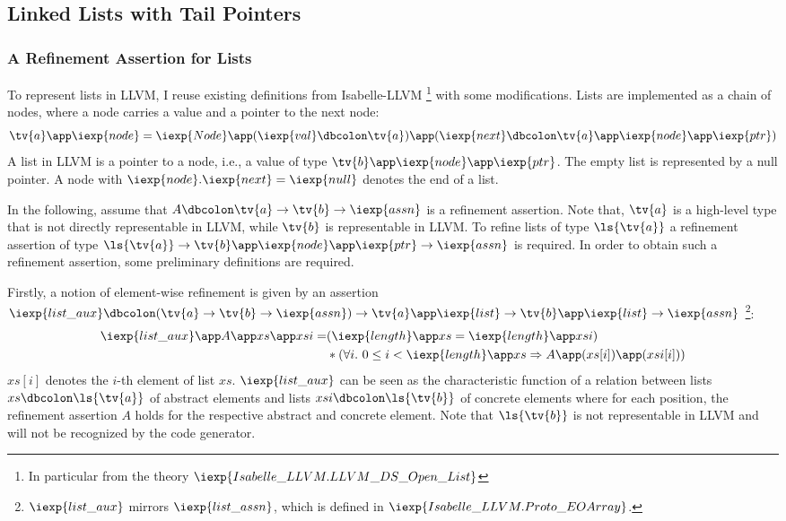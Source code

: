 \subsection{Linked Lists with Tail Pointers}\label{sec:lists-with-tail-pointers}

\subsubsection{A Refinement Assertion for Lists}

To represent lists in LLVM, I reuse existing definitions from Isabelle-LLVM \footnote{In particular from the theory $\iexp{Isabelle\_LLVM.LLVM\_DS\_Open\_List}$} with some modifications.
Lists are implemented as a chain of nodes, where a node carries a value and a pointer to the next node:
$$
  \tv{a} \app \iexp{node} = \iexp{Node} \app (\iexp{val} \dbcolon \tv{a}) \app (\iexp{next} \dbcolon \tv{a} \app \iexp{node} \app \iexp{ptr})
$$
A list in LLVM is a pointer to a node, i.e., a value of type $\tv{b} \app \iexp{node} \app \iexp{ptr}$.
The empty list is represented by a null pointer.
A node with $\iexp{node}.\iexp{next} = \iexp{null}$ denotes the end of a list.

In the following, assume that $A \dbcolon \tv{a} \rightarrow \tv{b} \rightarrow \iexp{assn}$ is a refinement assertion.
Note that, $\tv{a}$ is a high-level type that is not directly representable in LLVM, while $\tv{b}$ is representable in LLVM.
To refine lists of type $\ls{\tv{a}}$ a refinement assertion of type $\ls{\tv{a}} \rightarrow \tv{b} \app \iexp{node} \app \iexp{ptr} \rightarrow \iexp{assn}$ is required.
In order to obtain such a refinement assertion, some preliminary definitions are required.

Firstly, a notion of element-wise refinement is given by an assertion $\iexp{list\_aux} \dbcolon (\tv{a} \rightarrow \tv{b} \rightarrow \iexp{assn}) \rightarrow \tv{a} \app \iexp{list} \rightarrow \tv{b} \app \iexp{list} \rightarrow \iexp{assn}$
\footnote{$\iexp{list\_aux}$ mirrors $\iexp{list\_assn}$, which is defined in $\iexp{Isabelle\_LLVM.Proto\_EOArray}$.}:
\begin{align*}
  \iexp{list\_aux} \app A \app xs \app xsi =  &(\iexp{length} \app xs = \iexp{length} \app xsi) \\
                                                  &\ast (\forall i.\ 0 \le i < \iexp{length} \app xs \Rightarrow A \app (xs[i]) \app (xsi[i]))
\end{align*}
$xs[i]$ denotes the $i$-th element of list $xs$.
$\iexp{list\_aux}$ can be seen as the characteristic function of a relation between lists $xs \dbcolon \ls{\tv{a}}$ of abstract elements and lists $xsi \dbcolon \ls{\tv{b}}$ of concrete elements where for each position, the refinement assertion $A$ holds for the respective abstract and concrete element.
Note that $\ls{\tv{b}}$ is not representable in LLVM and will not be recognized by the code generator.

